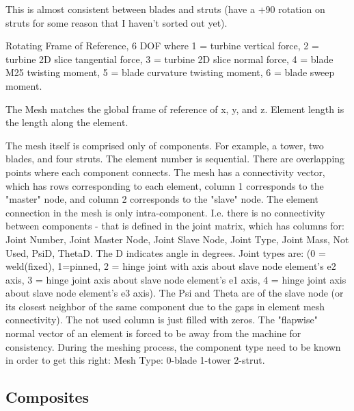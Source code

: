 \documentclass[11pt]{article}
\begin{document}
This is almost consistent between blades and struts (have a +90 rotation on struts for some reason that I haven’t sorted out yet).
 
 

Rotating Frame of Reference, 6 DOF where 1 = turbine vertical force, 2 = turbine 2D slice tangential force, 3 = turbine 2D slice normal force, 4 = blade M25 twisting moment, 5 = blade curvature twisting moment, 6 = blade sweep moment.

The Mesh matches the global frame of reference of x, y, and z.  Element length is the length along the element.

The mesh itself is comprised only of components.  For example, a tower, two blades, and four struts.  The element number is sequential. There are overlapping points where each component connects.  The mesh has a connectivity vector, which has rows corresponding to each element, column 1 corresponds to the "master" node, and column 2 corresponds to the "slave" node.  The element connection in the mesh is only intra-component.  I.e. there is no connectivity between components - that is defined in the joint matrix, which has columns for: Joint Number,   Joint Master Node, Joint Slave Node, Joint Type, Joint Mass, Not Used, PsiD, ThetaD.  The D indicates angle in degrees.  Joint types are: (0 = weld(fixed), 1=pinned, 2 = hinge joint with axis about slave node element’s e2 axis, 3 = hinge joint axis about slave node element’s e1 axis, 4 = hinge joint axis about slave node element’s e3 axis).  The Psi and Theta are of the slave node (or its closest neighbor of the same component due to the gaps in element mesh connectivity). The not used column is just filled with zeros.  The "flapwise" normal vector of an element is forced to be away from the machine for consistency.  During the meshing process, the component type need to be known in order to get this right: Mesh Type: 0-blade 1-tower 2-strut.

\subsection{Composites}
\end{document}
